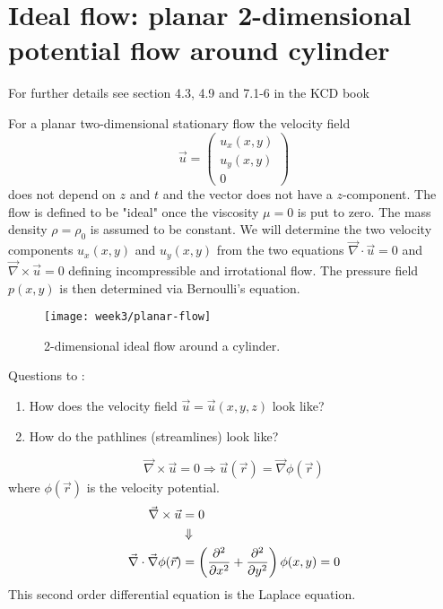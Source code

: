 \section{Ideal flow: planar 2-dimensional potential flow around cylinder}

\begin{framed}
For further details see section 4.3, 4.9 and 7.1-6 in the KCD book
\end{framed}

For a planar two-dimensional stationary flow the velocity field
\begin{equation}
\vec{u}=
\begin{pmatrix}
u_x(x,y)\\u_y(x,y)\\0
\end{pmatrix}
\end{equation}
does not depend on $z$ and $t$ and the vector does not have a $z$-component. The flow is defined to be "ideal" once the viscosity $\mu=0$ is put to zero. The mass density $\rho=\rho_0$ is assumed to be constant. We will determine the two velocity components $u_x(x,y)$ and $u_y(x,y)$ from the two equations $\vec{\nabla}\cdot\vec{u}=0$ and $\vec{\nabla}\times\vec{u}=0$ defining incompressible and irrotational flow. The pressure field $p(x,y)$ is then determined via Bernoulli's equation.

\begin{figure}[!h]
    \centering
    \texttt{[image: week3/planar-flow]}
    \caption{2-dimensional ideal flow around a cylinder.}
    \label{fig:planar-flow}
\end{figure}

Questions to :
\begin{enumerate}
\item How does the velocity field $\vec{u} = \vec{u}(x,y,z)$ look like?
\item How do the pathlines (streamlines) look like?
\end{enumerate}
\begin{equation}
\vec{\nabla}\times\vec{u} = 0 \Rightarrow \vec{u}(\vec{r}) = \vec{\nabla}\phi(\vec{r})
\end{equation}
where $\phi(\vec{r})$ is the velocity potential.
\begin{align}
\vec{\nabla}\times\vec{u} &= 0\\
&\Downarrow\notag\\
\vec{\nabla}\cdot\vec{\nabla}\phi(\vec{r}) &= \left(\frac{\partial^2 }{\partial x^2}+\frac{\partial^2 }{\partial y^2}\right)\phi(x,y) = 0
\end{align}
This second order differential equation is the Laplace equation.

